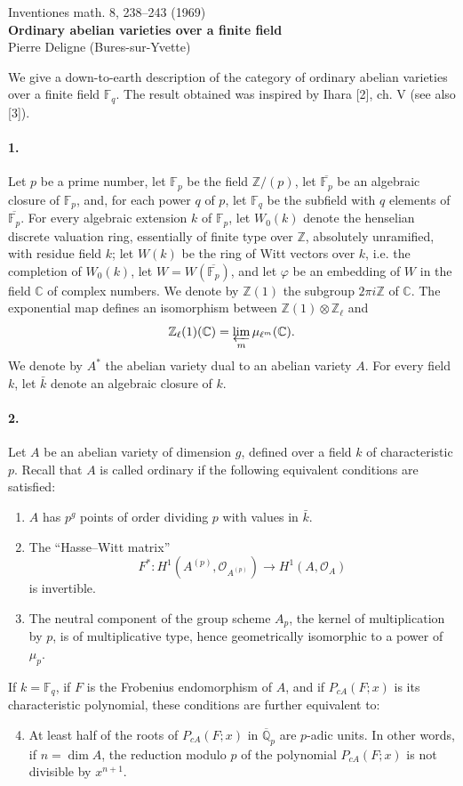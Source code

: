 \documentclass[10pt]{article}
\newcommand{\C}{\mathbb C}
\newcommand{\Fp}{\mathbb F_p}
\newcommand{\Fq}{\mathbb F_q}
\newcommand{\Q}{\mathbb Q}
\newcommand{\Z}{\mathbb Z}
\begin{document}
\begin{center}
{\small Inventiones math. 8, 238--243 (1969)}\\[3.0em]
{\Large\bfseries Ordinary abelian varieties over a finite field}\\[1.0em]
{\large Pierre Deligne (Bures-sur-Yvette)}
\end{center}

We give a down-to-earth description of the category of ordinary abelian varieties over a finite field $\Fq$. The result obtained was inspired by Ihara [2], ch. V (see also [3]).

\paragraph{1.} Let $p$ be a prime number, let $\Fp$ be the field $\Z/(p)$, let $\overline{\Fp}$ be an algebraic closure of $\Fp$, and, for each power $q$ of $p$, let $\Fq$ be the subfield with $q$ elements of $\overline{\Fp}$. For every algebraic extension $k$ of $\Fp$, let $W_0(k)$ denote the henselian discrete valuation ring, essentially of finite type over $\Z$, absolutely unramified, with residue field $k$; let $W(k)$ be the ring of Witt vectors over $k$, i.e. the completion of $W_0(k)$, let $W=W(\overline{\Fp})$, and let $\varphi$ be an embedding of $W$ in the field $\C$ of complex numbers. We denote by $\Z(1)$ the subgroup $2\pi i\Z$ of $\C$. The exponential map defines an isomorphism between $\Z(1)\otimes\Z_\ell$ and
\[
\Z_\ell(1)(\C)=\varprojlim_m\mu_{\ell^m}(\C).
\]
We denote by $A^*$ the abelian variety dual to an abelian variety $A$. For every field $k$, let $\bar k$ denote an algebraic closure of $k$.

\paragraph{2.} Let $A$ be an abelian variety of dimension $g$, defined over a field $k$ of characteristic $p$. Recall that $A$ is called ordinary if the following equivalent conditions are satisfied:
\begin{enumerate}[label=(\Roman*)]
\item $A$ has $p^g$ points of order dividing $p$ with values in $\bar k$.
\item The ``Hasse--Witt matrix''
\[
F^*:H^1(A^{(p)},\mathcal O_{A^{(p)}})\longrightarrow H^1(A,\mathcal O_A)
\]
is invertible.
\item The neutral component of the group scheme $A_p$, the kernel of multiplication by $p$, is of multiplicative type, hence geometrically isomorphic to a power of $\mu_p$.
\end{enumerate}
If $k=\Fq$, if $F$ is the Frobenius endomorphism of $A$, and if $P_{cA}(F;x)$ is its characteristic polynomial, these conditions are further equivalent to:
\begin{enumerate}[label=(\Roman*)]
\setcounter{enumi}{3}
\item At least half of the roots of $P_{cA}(F;x)$ in $\overline{\Q}_p$ are $p$-adic units. In other words, if $n=\dim A$, the reduction modulo $p$ of the polynomial $P_{cA}(F;x)$ is not divisible by $x^{n+1}$.
\end{enumerate}
\end{document}
